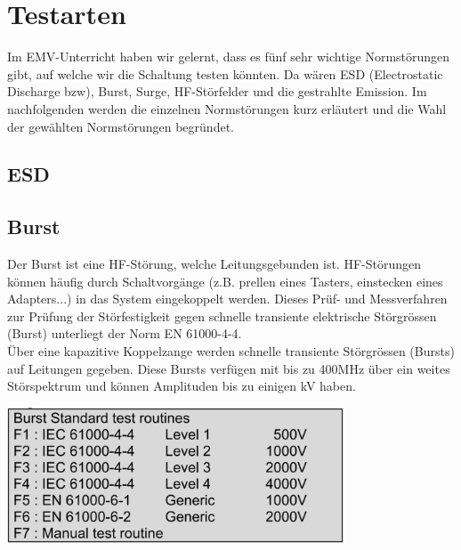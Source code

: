 \section{Testarten}
\label{sec:TestUndNorm}

Im EMV-Unterricht haben wir gelernt, dass es fünf sehr wichtige Normstörungen gibt, auf welche wir die Schaltung testen könnten. Da wären ESD (Electrostatic Discharge bzw), Burst, Surge, HF-Störfelder und die gestrahlte Emission. Im nachfolgenden werden die einzelnen Normstörungen kurz erläutert und die Wahl der gewählten Normstörungen begründet.
\subsection{ESD}

\subsection{Burst}
Der Burst ist eine HF-Störung, welche Leitungsgebunden ist. HF-Störungen können häufig durch Schaltvorgänge (z.B. prellen eines Tasters, einstecken eines Adapters...) in das System eingekoppelt werden. Dieses Prüf- und Messverfahren zur Prüfung der Störfestigkeit gegen schnelle transiente elektrische Störgrössen (Burst) unterliegt der Norm EN 61000-4-4.\\[0.25cm]
Über eine kapazitive Koppelzange werden schnelle transiente Störgrössen (Bursts) auf Leitungen gegeben. Diese Bursts verfügen mit bis zu 400MHz über ein weites Störspektrum und können Amplituden bis zu einigen kV haben.\\

\begin{minipage}[b][6cm][t]{1\textwidth}
\centering
\includegraphics[angle=0,width=0.75\textwidth]{graphics/BurstProgramm.jpg}
\label{fig:BurstProgramm}
\end{minipage}

